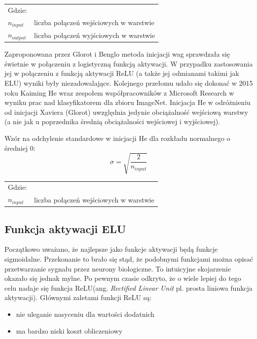 \documentclass[a4paper,11pt]{article}
\begin{document}
    \smallskip

    \begin{tabular}{p{}p{}}
        Gdzie: \\
        $n_{input}$  & liczba połączeń wejściowych w warstwie \\
        $n_{output}$ & liczba połączeń wyjściowych w warstwie \\
    \end{tabular}

    \bigskip

    Zaproponowana przez Glorot i Benglo metoda inicjacji wag sprawdzała się świetnie w połączeniu z logistyczną funkcją aktywacji. W przypadku zastosowania jej w połączeniu z funkcją aktywacji ReLU (a także jej odmianami takimi jak ELU) wyniki były niezadowalające. Kolejnego przełomu udało się dokonać w 2015 roku Kaiming He wraz zespołem współpracowników z Microsoft Research w wyniku prac nad klasyfikatorem dla zbioru ImageNet\cite{DelvingDeepIntoRectifiers2015}. Inicjacja He w odróżnieniu od inicjacji Xaviera (Glorot) uwzględnia jedynie obciążalność wejściową warstwy (a nie jak u poprzednika średnią obciążalności wejściowej i wyjściowej)\cite{UczenieMaszynowe2018}.

    \bigskip

    Wzór na odchylenie standardowe w inicjacji He dla rozkładu normalnego o średniej 0: \\
    \begin{equation}
        \label{equ:std_dev_he}
        \sigma = \sqrt{\frac{2}{n_{input}}}
    \end{equation}

    \smallskip

    \begin{tabular}{p{}p{}}
        Gdzie: \\
        $n_{input}$ & liczba połączeń wejściowych w warstwie \\
    \end{tabular}

    \subsection{Funkcja aktywacji ELU}

    Początkowo uważano, że najlepsze jako funkcje aktywacji będą funkcje sigmoidalne. Przekonanie to brało się stąd, że podobnymi funkcjami można opisać przetwarzanie sygnału przez neurony biologiczne. To intuicyjne skojarzenie okazało się jednak mylne. Po pewnym czasie odkryto, że o wiele lepiej do tego celu nadaje się funkcja ReLU(ang. \textit{Rectified Linear Unit} pl. prosta liniowa funkcja aktywacji)\cite{UczenieMaszynowe2018}. Głównymi zaletami funkcji ReLU są:
    \begin{itemize}
        \item nie uleganie nasyceniu dla wartości dodatnich
        \item ma bardzo niski koszt obliczeniowy
    \end{itemize}
\end{document}
